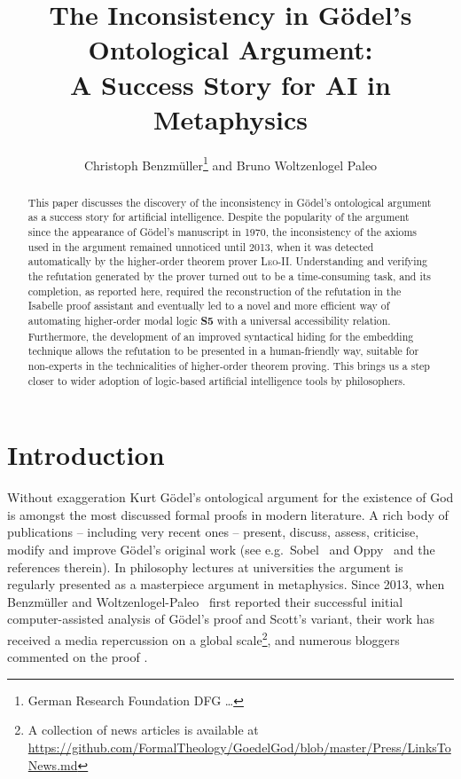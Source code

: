 \documentclass{article}
\title{The Inconsistency in G\"odel's Ontological Argument: \\ A Success Story for AI in Metaphysics}
\author{Christoph Benzm\"uller\thanks{German Research Foundation DFG \ldots} and Bruno Woltzenlogel Paleo}
\author{}
\begin{document}
\maketitle

\begin{abstract}
  This paper discusses the discovery of the inconsistency in G\"odel's
  ontological argument as a success story for artificial
  intelligence. Despite the popularity of the argument since the
  appearance of G\"odel's manuscript in 1970, the inconsistency of the
  axioms used in the argument remained unnoticed until 2013, when it
  was detected automatically by the higher-order theorem prover
  \textsc{Leo-II}. 
  Understanding and verifying the refutation
  generated by the prover turned out to be a time-consuming task, and
  its completion, as reported here, required the reconstruction of the
  refutation in the Isabelle proof assistant and eventually led to a novel and more efficient way of automating higher-order modal logic \textbf{S5} with a universal accessibility relation. Furthermore, the development of an
  improved syntactical hiding for the embedding technique
  allows the refutation to be
  presented in a human-friendly way, suitable for non-experts in the
  technicalities of higher-order theorem proving. This brings us a
  step closer to wider adoption of logic-based artificial intelligence
  tools by philosophers.
\end{abstract}


\section{Introduction}\label{sec:introduction}
Without exaggeration Kurt G\"{o}del's ontological
argument for the existence of God \cite{GoedelNotes,ScottNotes} is
amongst the most discussed formal proofs in modern literature. A rich
body of publications -- including very recent ones -- present,
discuss, assess, criticise, modify and improve G\"{o}del's original
work (see e.g.~Sobel~ and Oppy~ and the
references therein).  In philosophy lectures at universities the
argument is regularly presented as a masterpiece argument in
metaphysics. Since 2013, when Benzm\"uller and Woltzenlogel-Paleo~ first
reported their successful initial computer-assisted
analysis of G\"odel's proof and Scott's variant,
their work has received a media repercussion on a global scale\footnote{A
  collection of news articles is available at {\scriptsize
    \url{https://github.com/FormalTheology/GoedelGod/blob/master/Press/LinksToNews.md}}},
and numerous bloggers commented on the proof
\cite{fuhrmann15:_blogg_goedel}.
\end{document}
